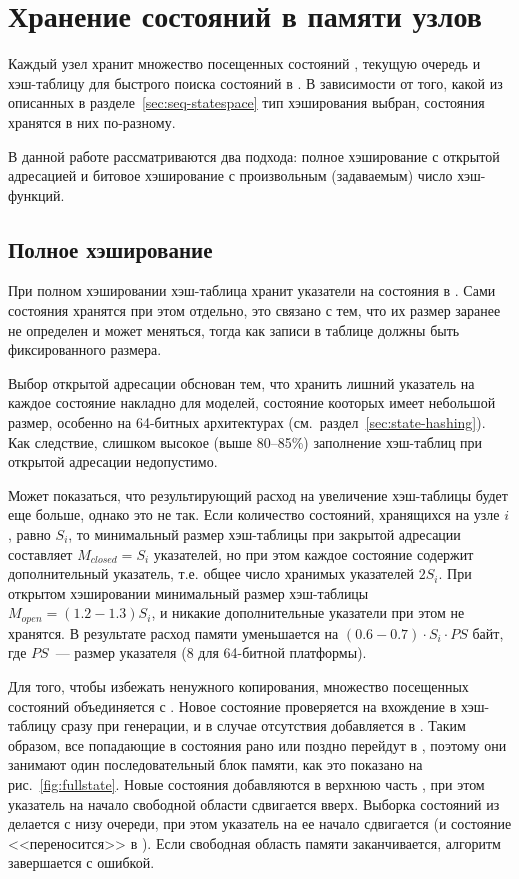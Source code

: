 \chapter{Хранение состояний в памяти узлов}
\label{cha:par-state-store}

Каждый узел хранит множество посещенных состояний , текущую очередь
 и хэш-таблицу для быстрого поиска состояний в . В зависимости
от того, какой из описанных в разделе~\ref{sec:seq-statespace} тип хэширования выбран,
состояния хранятся в них по-разному.

В данной работе рассматриваются два подхода: полное хэширование с открытой адресацией и
битовое хэширование с произвольным (задаваемым) число хэш-функций.

\section{Полное хэширование}
\label{sec:fullhash-store}

При полном хэшировании хэш-таблица хранит указатели на состояния в . Сами
состояния хранятся при этом отдельно, это связано с тем, что их размер заранее не
определен и может меняться, тогда как записи в таблице должны быть фиксированного размера.

Выбор открытой адресации обснован тем, что хранить лишний указатель на каждое состояние
накладно для моделей, состояние кооторых имеет небольшой размер, особенно на 64-битных
архитектурах (см.~раздел~\ref{sec:state-hashing}). Как следствие, слишком высокое (выше
80--85\%) заполнение хэш-таблиц при открытой адресации недопустимо.

Может показаться, что результирующий расход на увеличение хэш-таблицы будет еще больше,
однако это не так. Если количество состояний, хранящихся на узле $i$, равно $S_i$, то
минимальный размер хэш-таблицы при закрытой адресации составляет $M_{closed} = S_i$
указателей, но при этом каждое состояние содержит дополнительный указатель, т.е. общее
число хранимых указателей $2 S_i$. При открытом хэшировании минимальный размер хэш-таблицы
$M_{open} = (1.2-1.3)S_i$, и никакие дополнительные указатели при этом не хранятся. В
результате расход памяти уменьшается на $(0.6-0.7)\cdot S_i\cdot PS$ байт, где $PS$~---
размер указателя ($8$ для 64-битной платформы).

Для того, чтобы избежать ненужного копирования, множество посещенных состояний
 объединяется с . Новое состояние проверяется на вхождение в
хэш-таблицу сразу при генерации, и в случае отсутствия добавляется в . Таким
образом, все попадающие в  состояния рано или поздно перейдут в
, поэтому они занимают один последовательный блок памяти, как это показано
на рис.~\ref{fig:fullstate}. Новые состояния добавляются в верхнюю часть ,
при этом указатель на начало свободной области сдвигается вверх. Выборка состояний из
 делается с низу очереди, при этом указатель на ее начало сдвигается (и
состояние <<переносится>> в ). Если свободная область памяти заканчивается,
алгоритм завершается с ошибкой.

